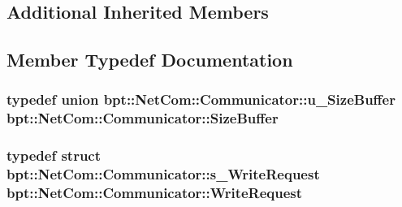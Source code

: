 \subsection*{Additional Inherited Members}


\subsection{Member Typedef Documentation}
\hypertarget{classbpt_1_1_net_com_1_1_communicator_ad3c27ccd1f2a96ae2a958e92d01de58d}{
\subsubsection[{Size\-Buffer}]{\setlength{\rightskip}{0pt plus 5cm}typedef union {\bf bpt\-::\-Net\-Com\-::\-Communicator\-::u\-\_\-\-Size\-Buffer}					 {\bf bpt\-::\-Net\-Com\-::\-Communicator\-::\-Size\-Buffer}\hspace{0.3cm}{\ttfamily [protected]}}}\label{classbpt_1_1_net_com_1_1_communicator_ad3c27ccd1f2a96ae2a958e92d01de58d}
\hypertarget{classbpt_1_1_net_com_1_1_communicator_acf7d4d13d65749b0a202776c587c3502}{
\subsubsection[{Write\-Request}]{\setlength{\rightskip}{0pt plus 5cm}typedef struct {\bf bpt\-::\-Net\-Com\-::\-Communicator\-::s\-\_\-\-Write\-Request}					 {\bf bpt\-::\-Net\-Com\-::\-Communicator\-::\-Write\-Request}\hspace{0.3cm}{\ttfamily [protected]}}}\label{classbpt_1_1_net_com_1_1_communicator_acf7d4d13d65749b0a202776c587c3502}


